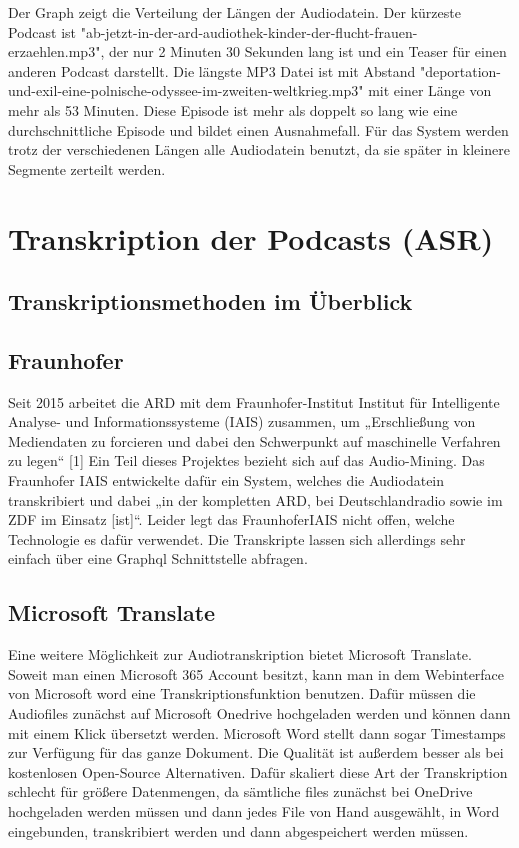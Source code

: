 Der Graph zeigt die Verteilung der Längen der Audiodatein.
Der kürzeste Podcast ist "ab-jetzt-in-der-ard-audiothek-kinder-der-flucht-frauen-erzaehlen.mp3", der nur 2 Minuten 30 Sekunden lang ist und ein Teaser für einen anderen Podcast darstellt.
Die längste MP3 Datei ist mit Abstand "deportation-und-exil-eine-polnische-odyssee-im-zweiten-weltkrieg.mp3" mit einer Länge von mehr als 53 Minuten.
Diese Episode ist mehr als doppelt so lang wie eine durchschnittliche Episode und bildet einen Ausnahmefall.
Für das System werden trotz der verschiedenen Längen alle Audiodatein benutzt, da sie später in kleinere Segmente zerteilt werden.



\section{Transkription der Podcasts (ASR)}

\subsection{Transkriptionsmethoden im Überblick}



\subsection{Fraunhofer}

Seit 2015 arbeitet die ARD mit dem Fraunhofer-Institut Institut für Intelligente Analyse- und Informationssysteme (IAIS) zusammen, um „Erschließung von Mediendaten zu forcieren und dabei den Schwerpunkt auf maschinelle Verfahren zu legen“ [1]
Ein Teil dieses Projektes bezieht sich auf das Audio-Mining. 
Das Fraunhofer IAIS entwickelte dafür ein System, welches die Audiodatein transkribiert und dabei „in der kompletten ARD, bei Deutschlandradio sowie im ZDF im Einsatz [ist]“. 
Leider legt das FraunhoferIAIS nicht offen, welche Technologie es dafür verwendet. 
Die Transkripte lassen sich allerdings sehr einfach über eine Graphql Schnittstelle abfragen. 

\subsection{Microsoft Translate}

Eine weitere Möglichkeit zur Audiotranskription bietet Microsoft Translate. 
Soweit man einen Microsoft 365 Account besitzt, kann man in dem Webinterface von Microsoft word eine Transkriptionsfunktion benutzen. 
Dafür müssen die Audiofiles zunächst auf Microsoft Onedrive hochgeladen werden und können dann mit einem Klick übersetzt werden. 
Microsoft Word stellt dann sogar Timestamps  zur Verfügung für das ganze Dokument. 
Die Qualität ist außerdem besser als bei kostenlosen Open-Source Alternativen. 
Dafür skaliert diese Art der Transkription schlecht für größere Datenmengen, da sämtliche files zunächst bei OneDrive hochgeladen werden müssen und dann jedes File von Hand ausgewählt, in Word eingebunden, transkribiert werden und dann abgespeichert werden müssen. 

